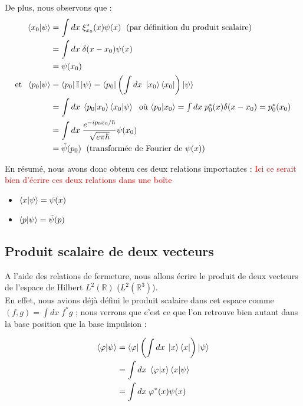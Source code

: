 \documentclass{article}
\begin{document}
De plus, nous observons que : 
\begin{align}
    \braket{x_0| \psi} &= \int dx \; \xi_{x_0}^*(x) \psi(x) \; \mbox{ (par définition du produit scalaire)} \\
    &= \int dx \; \delta(x-x_0)\psi(x) \\
    &= \psi(x_0)\\
    \mbox{et } \; \braket{p_0|\psi} &= \bra{p_0}\mathbb{I}\ket{\psi} = \bra{p_0} \left( \int dx \; \ket{x_0} \bra{x_0} \right) \ket{\psi} \\
    &= \int dx \; \braket{p_0|x_0} \braket{x_0|\psi} \; \mbox{ où $\braket{p_0|x_0} = \int dx \; p_0^*(x) \delta(x-x_0) = p_0^*(x_0)$} \\
    &= \int dx \; \frac{e^{-ip_0x_0/\hbar}}{\sqrt{e\pi \hbar}} \psi(x_0) \\
    &= \tilde{\psi}(p_0) \; \mbox{ (transformée de Fourier de $\psi(x)$)} \\
\end{align}

En résumé, nous avons donc obtenu ces deux relations importantes : \textcolor{red}{Ici ce serait bien d'écrire ces deux relations dans une boîte}
\begin{itemize}[label=\textbullet]
    \item $\braket{x|\psi} = \psi(x)$
    \item $\braket{p|\psi} = \tilde{\psi}(p)$
\end{itemize}


\subsection*{Produit scalaire de deux vecteurs}
A l'aide des relations de fermeture, nous allons écrire le produit de deux vecteurs de l'espace de Hilbert $L^2(\mathbb{R})$ ($L^2(\mathbb{R}^3)$). \\
En effet, nous avions déjà défini le produit scalaire dans cet espace comme $(f,g) = \int dx \; f^* g$ ; nous verrons que c'est ce que l'on retrouve bien autant dans la base position que la base impulsion : 

\begin{align}
        \braket{\varphi | \psi} &= \bra{\varphi} \left( \int dx \; \ket{x}\bra{x} \right) \ket{\psi} \\
        &= \int dx \; \braket{\varphi |x}\braket{x|\psi} \\
        &= \int dx \; \varphi^*(x)\psi(x)
\end{align}
\end{document}
